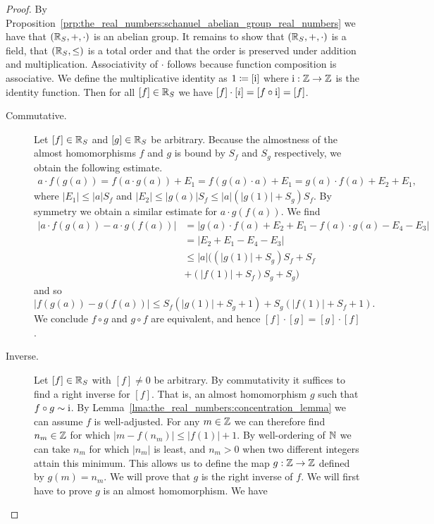 \documentclass[../main.tex]{subfiles}
\begin{document}
\begin{proof}
    By Proposition~\ref{prp:the_real_numbers:schanuel_abelian_group_real_numbers} we have that $(\mathbb{R}_S,+,\cdot)$ is an abelian group. It remains to show that $(\mathbb{R}_S,+,\cdot)$ is a field, that $(\mathbb{R}_S,\leq)$ is a total order and that the order is preserved under addition and multiplication. Associativity of $\cdot$ follows because function composition is associative. We define the multiplicative identity as $1\coloneq[\operatorname{i}]$ where $\operatorname{i}:\mathbb{Z}\to\mathbb{Z}$ is the identity function. Then for all $[f]\in\mathbb{R}_S$ we have $[f]\cdot[i]=[f\circ\operatorname{i}]=[f]$.
    \begin{description}
        \item[Commutative.] Let $[f]\in\mathbb{R}_S$ and $[g]\in\mathbb{R}_S$ be arbitrary. Because the almostness of the almost homomorphisms $f$ and $g$ is bound by $S_f$ and $S_g$ respectively, we obtain the following estimate.
        \begin{align*}
            a\cdot f(g(a))=f(a\cdot g(a))+E_1=f(g(a)\cdot a)+E_1=g(a)\cdot f(a)+E_2+E_1,
        \end{align*}
        where $\vert E_1\vert\leq\vert a\vert S_f$ and $\vert E_2\vert\leq\vert g(a)\vert S_f\leq\vert a\vert(\vert g(1)\vert+S_g)S_f$. By symmetry we obtain a similar estimate for $a\cdot g(f(a))$. We find
        \begin{align*}
            \vert a\cdot f(g(a))-a\cdot g(f(a))\vert & =\vert g(a)\cdot f(a)+E_2+E_1-f(a)\cdot g(a)-E_4-E_3\vert \\
            & =\vert E_2+E_1-E_4-E_3\vert \\
            & \leq\vert a\vert\bigl((\vert g(1)\vert+S_g)S_f+S_f \\
            & +(\vert f(1)\vert+S_f)S_g+S_g\bigr)
        \end{align*}
        and so
        \begin{equation*}
            \vert f(g(a))-g(f(a))\vert\leq S_f(\vert g(1)\vert+S_g+1)+S_g(\vert f(1)\vert+S_f+1).
        \end{equation*}
        We conclude $f\circ g$ and $g\circ f$ are equivalent, and hence $[f]\cdot[g]=[g]\cdot[f]$.
        \item[Inverse.] Let $[f]\in\mathbb{R}_S$ with $[f]\neq0$ be arbitrary. By commutativity it suffices to find a right inverse for $[f]$. That is, an almost homomorphism $g$ such that $f\circ g\sim\operatorname{i}$. By Lemma~\ref{lma:the_real_numbers:concentration_lemma} we can assume $f$ is well-adjusted. For any $m\in\mathbb{Z}$ we can therefore find $n_m\in\mathbb{Z}$ for which $\vert m-f(n_m)\vert\leq\vert f(1)\vert+1$. By well-ordering of $\mathbb{N}$ we can take $n_m$ for which $\vert n_m\vert$ is least, and $n_m>0$ when two different integers attain this minimum. This allows us to define the map $g:\mathbb{Z}\to\mathbb{Z}$ defined by $g(m)=n_m$. We will prove that $g$ is the right inverse of $f$. We will first have to prove $g$ is an almost homomorphism. We have

\end{description}
\end{proof}
\end{document}
